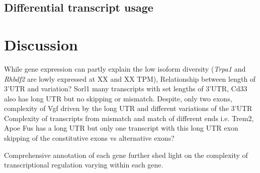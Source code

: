 \subsection{Differential transcript usage}

\section{Discussion}
While gene expression can partly explain the low isoform diversity (\textit{Trpa1} and \textit{Rhbdf2} are lowly expressed at XX and XX TPM), 
Relationship between length of 3'UTR and variation? Sorl1 many transcripts with set lengths of 3'UTR, Cd33 also has long UTR but no skipping or mismatch. Despite, only two exons, complexity of Vgf driven by the long UTR and different variations of the 3'UTR 
Complexity of transcripts from mismatch and match of different ends i.e. Trem2, Apoe
Fus has a long UTR but only one transcript with this long UTR 	
exon skipping of the constitutive exons vs alternative exons?

Comprehensive annotation of each gene further shed light on the complexity of transcriptional regulation varying within each gene.
